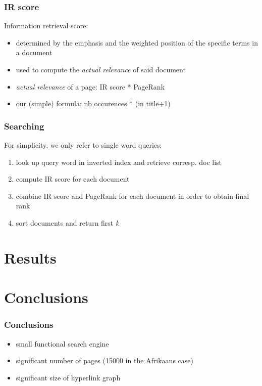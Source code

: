\documentclass[10pt]{beamer}
\begin{document}
\begin{frame}
\frametitle{IR score}
Information retrieval score:

\begin{itemize}
\item determined by the emphasis and the weighted position of the specific terms in a document
\item used to compute the \emph{actual relevance}  of said document
\item \emph{actual relevance} of a page: IR score * PageRank
\item our (simple) formula: nb$\_$occurences * (in$\_$title+1)
\end{itemize}
\end{frame}

\begin{frame}
\frametitle{Searching}

For simplicity, we only refer to single word queries:
\begin{enumerate}
\item look up query word in inverted index and retrieve corresp. doc list
\item compute IR score for each document
\item combine IR score and PageRank for each document in order to obtain final rank
\item sort documents and return first \emph{k}
\end{enumerate}
\end{frame}






\section{Results}



\section{Conclusions}
\begin{frame}
\frametitle{Conclusions}

\begin{itemize}
\item small functional search engine
\item significant number of pages (15000 in the Afrikaans case)
\item significant size of hyperlink graph
\end{itemize}
\end{frame}
\end{document}

